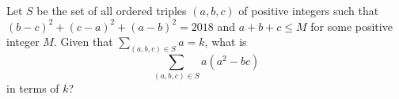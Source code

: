 Let $S$ be the set of all ordered triples $\left(a,b,c\right)$ of positive integers such that $\left(b-c\right)^2+\left(c-a\right)^2+\left(a-b\right)^2=2018$ and $a+b+c\leq M$ for some positive integer $M$. Given that $\displaystyle\sum_{\left(a,b,c\right)\in S}a=k$, what is $$\displaystyle\sum_{\left(a,b,c\right)\in S}a\left(a^2-bc\right)$$ in terms of $k$?